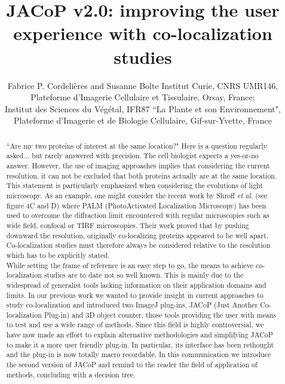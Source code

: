 \documentclass[]{spie}  %
\title{JACoP v2.0: improving the user experience with co-localization studies}
\author{Fabrice P. Cordeli\`{e}res\supit{a} and Susanne Bolte\supit{b}
\skiplinehalf
\supit{a}Institut Curie, CNRS UMR146, Plateforme d'Imagerie Cellulaire et Tissulaire, Orsay, France; \\
\supit{b}Institut des Sciences du V\'{e}g\'{e}tal, IFR87 ``La Plante et son Environnement", Plateforme d'Imagerie et de Biologie Cellulaire, Gif-sur-Yvette, France
}
\begin{document}
\maketitle
\begin{abstract}
``Are my two proteins of interest at the same location?" Here is a question regularly asked... but rarely answered with precision. The cell biologist expects a yes-or-no answer. However, the use of imaging approaches implies that considering the current resolution, it can not be excluded that both proteins actually are at the same location. This statement is particularly emphasized when considering the evolutions of light microscopy. As an example, one might consider the recent work by Shroff \textit{et al.}\cite{HariShroff12182007} (see figure 4C and D) where PALM (PhotoActivated Localization Microscopy) has been used to overcome the diffraction limit encountered with regular microscopies such as wide field, confocal or TIRF microscopies. Their work proved that by pushing downward the resolution, originally co-localizing proteins appeared to be well apart. Co-localization studies must therefore always be considered relative to the resolution which has to be explicitly stated. \\
While setting the frame of reference is an easy step to go, the means to achieve co-localization studies are to date not so well known. This is mainly due to the widespread of generalist tools lacking information on their application domains and limits. In our previous work\cite{tutrev2006} we wanted to provide insight in current approaches to study co-localization and introduced two ImageJ plug-ins, JACoP (Just Another Co-localization Plug-in) and 3D object counter, those tools providing the user with means to test and use a wide range of methods. Since this field is highly controversial\cite{leted2007,ansleted2007}, we have now made an effort to explain alternative methodologies and simplifying JACoP to make it a more user friendly plug-in. In particular, its interface has been rethought and the plug-in is now totally macro recordable. In this communication we introduce the second version of JACoP and remind to the reader the field of application of methods, concluding with a decision tree.
\end{abstract}
\end{document}
